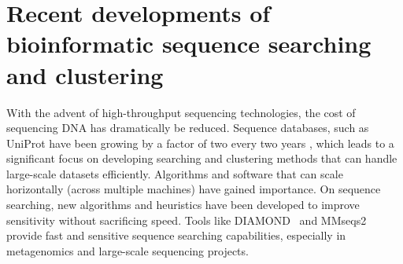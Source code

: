 \documentclass[twoside,a4paper,bsc]{master}
\begin{document}
\section{Recent developments of bioinformatic sequence searching and
clustering}
With the advent of high-throughput sequencing technologies, the cost of
sequencing DNA has dramatically be reduced. Sequence databases, such as
UniProt have been growing by a factor of two every two years , which leads
to a significant focus on developing searching and clustering methods that
can handle large-scale datasets efficiently. Algorithms and software that
can scale horizontally (across multiple machines) have gained importance.
On sequence searching, new algorithms and heuristics have been developed to
improve sensitivity without sacrificing speed. Tools like
DIAMOND~\cite{buchfink2015fast,BUC:REU:DRO:2021} and
MMseqs2~\cite{steinegger2017mmseqs2} provide fast and sensitive sequence
searching capabilities,
especially in metagenomics and large-scale sequencing projects.
\end{document}
